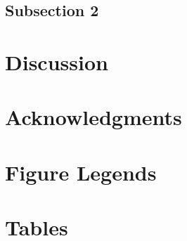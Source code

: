 \documentclass[11pt]{article}
\begin{document}
\subsection*{Subsection 2}

\section*{Discussion}


\section*{Acknowledgments}




\section*{Figure Legends}


\section*{Tables}
\end{document}
